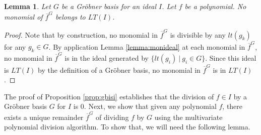 \documentclass{msthesis}
\newtheorem{lemma}[theorem]{Lemma}
\theoremstyle{definition}
\begin{document}
\begin{lemma}\label{lemma:remmoninlti}
    Let $G$ be a Gr\"obner basis for an ideal $I$. Let $f$ be a polynomial.  No monomial of $\overline{f}^G$ belongs to $LT(I)$.
\end{lemma}
\begin{proof}
    Note that by construction, no monomial in $\overline{f}^G$ is divisible by any $lt(g_k)$ for any $g_k \in G$.  By application Lemma \ref{lemma:monideal} at each monomial in $\overline{f}^G$, no monomial in $\overline{f}^G$ is in the ideal generated by $\{lt(g_i)\ |\ g_i \in G\}$.  Since this ideal is $LT(I)$ by the definition of a Gr\"obner basis, no monomial in $\overline{f}^G$ is in $LT(I)$.
\end{proof}

The proof of Proposition \ref{prop:gbisi} establishes  that the division of $f \in I$ by a Gr\"obner basis $G$ for $I$ is $0$.  Next, we show that given any polynomial $f$, there exists a unique remainder $\overline{f}^G$ of dividing $f$ by $G$ using the multivariate polynomial division algorithm.  To show that, we will need the following lemma.
\end{document}
